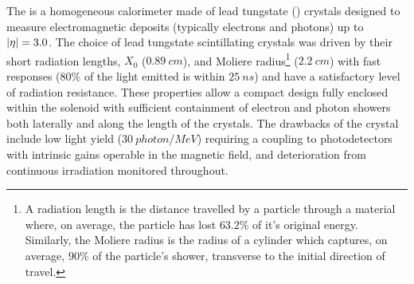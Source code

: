 The \ECAL \cite{Bayatian:922757} is a homogeneous calorimeter made of lead tungstate (\pbwo) crystals designed to measure electromagnetic deposits (typically electrons and photons) up to ${|\eta|=3.0}$. The choice of lead tungstate scintillating crystals was driven by their short radiation lengths, $X_0$ (${\SI{0.89}{cm}}$), and Moliere radius\footnote{A radiation length is the distance travelled by a particle through a material where, on average, the particle has lost $63.2\%$ of it's original energy. Similarly, the Moliere radius is the radius of a cylinder which captures, on average, $90\%$ of the particle's shower, transverse to the initial direction of travel.} (${\SI{2.2}{cm}}$) with fast responses ($80\%$ of the light emitted is within ${\SI{25}{ns}}$) and have a satisfactory level of radiation resistance. These properties allow a compact design fully enclosed within the solenoid with sufficient containment of electron and photon showers both laterally and along the length of the crystals. The drawbacks of the crystal include low light yield (${\SI{30}{photon/MeV}}$) requiring a coupling to photodetectors with intrinsic gains operable in the magnetic field, and deterioration from continuous irradiation monitored throughout.

